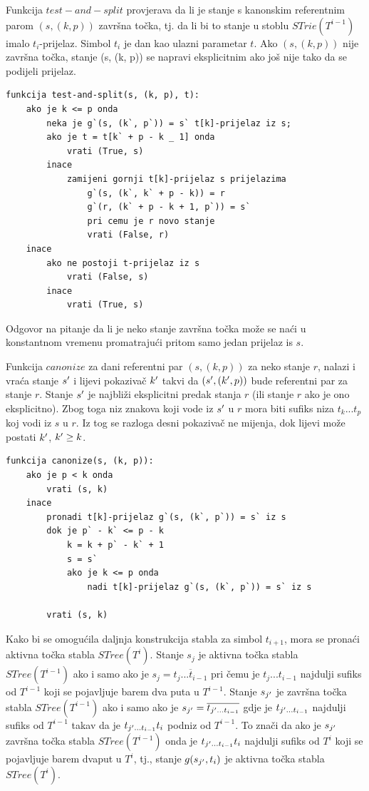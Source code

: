 \documentclass[times, utf8, seminar, numeric]{fer}
\begin{document}
	Funkcija $test-and-split$ provjerava da li je stanje s kanonskim referentnim parom $(s, (k, p))$ završna točka, tj. da li bi to stanje u stoblu $STrie(T^{i-1})$ imalo $t_i$-prijelaz. Simbol $t_i$ je dan kao ulazni parametar $t$. Ako $(s, (k, p))$ nije završna točka, stanje (s, (k, p)) se napravi eksplicitnim ako još nije tako da se podijeli prijelaz. 

\begin{lstlisting}[caption=Funkcija $test-and-split$, label=testandsplit]
funkcija test-and-split(s, (k, p), t):
	ako je k <= p onda
		neka je g`(s, (k`, p`)) = s` t[k]-prijelaz iz s;
		ako je t = t[k` + p - k _ 1] onda
			vrati (True, s)
		inace
			zamijeni gornji t[k]-prijelaz s prijelazima
				g`(s, (k`, k` + p - k)) = r
				g`(r, (k` + p - k + 1, p`)) = s`
				pri cemu je r novo stanje
				vrati (False, r)
	inace
		ako ne postoji t-prijelaz iz s
			vrati (False, s)
		inace
			vrati (True, s)
\end{lstlisting}

	Odgovor na pitanje da li je neko stanje završna točka može se naći u konstantnom vremenu promatrajući pritom samo jedan prijelaz is $s$.
	
	Funkcija $canonize$ za dani referentni par $(s, (k, p))$ za neko stanje $r$, nalazi i vraća stanje $s\rq{}$ i lijevi pokazivač $k\rq{}$ takvi da $(s\rq{}, (k\rq{}, p))$ bude referentni par za stanje $r$. Stanje $s\rq{}$ je najbliži eksplicitni predak stanja $r$ (ili stanje $r$ ako je ono eksplicitno). Zbog toga niz znakova koji vode iz $s\rq{}$ u $r$ mora biti sufiks niza $t_k ... t_p$ koj vodi iz $s$ u $r$. Iz tog se razloga desni pokazivač ne mijenja, dok lijevi može postati $k\rq{}$, $k\rq{} \ge k$.
	
\begin{lstlisting}[caption=Funkcija $canonize$, label=canonize]
funkcija canonize(s, (k, p)):
	ako je p < k onda
		vrati (s, k)
	inace
		pronadi t[k]-prijelaz g`(s, (k`, p`)) = s` iz s
		dok je p` - k` <= p - k
			k = k + p` - k` + 1
			s = s`
			ako je k <= p onda
				nadi t[k]-prijelaz g`(s, (k`, p`)) = s` iz s
				
		vrati (s, k)
\end{lstlisting}

	Kako bi se omogućila daljnja konstrukcija stabla za simbol $t_{i+1}$, mora se pronaći aktivna točka stabla $STree(T^i)$. Stanje $s_j$ je aktivna točka stabla $STree(T^{i-1})$ ako i samo ako je $s_j = \overline{t_j ... t_{i-1}}$ pri čemu je $t_j ... t_{i-1}$ najdulji sufiks od $T^{i-1}$ koji se pojavljuje barem dva puta u $T^{i-1}$. Stanje $s_{j\rq{}}$ je završna točka stabla $STree(T^{i-1})$ ako i samo ako je $s_{j\rq{}} = \overline{t_{j\rq{} ... t_{i-1}}}$ gdje je $t_{j\rq{} ... t_{i-1}}$ najdulji sufiks od $T^{i-1}$ takav da je $t_{j\rq{} ... t_{i-1}} t_i$ podniz od $T^{i-1}$. To znači da ako je $s_{j\rq{}}$ završna točka stabla $STree(T^{i-1})$ onda je $t_{j\rq{} ... t_{i-1}} t_i$ najdulji sufiks od $T^i$ koji se pojavljuje barem dvaput u $T^i$, tj., stanje $g(s_{j\rq{}}, t_i)$ je aktivna točka stabla $STree(T^i)$.
			
\end{document}
